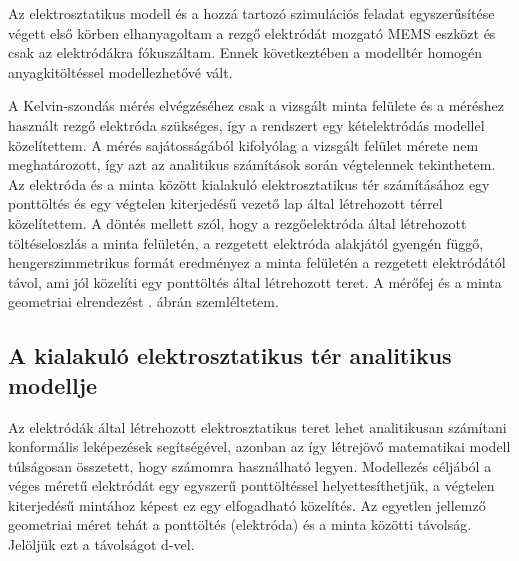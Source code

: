 Az elektrosztatikus modell és a hozzá tartozó szimulációs feladat egyszerűsítése végett első körben elhanyagoltam a rezgő elektródát mozgató MEMS eszközt és csak az elektródákra fókuszáltam. Ennek következtében a modelltér homogén anyagkitöltéssel modellezhetővé vált.

A Kelvin-szondás mérés elvégzéséhez csak a vizsgált minta felülete és a méréshez használt rezgő elektróda szükséges, így a rendszert egy kételektródás modellel közelítettem. A mérés sajátosságából kifolyólag a vizsgált felület mérete nem meghatározott, így azt az analitikus számítások során végtelennek tekinthetem. Az elektróda és a minta között kialakuló elektrosztatikus tér számításához egy ponttöltés és egy végtelen kiterjedésű vezető lap által létrehozott térrel közelítettem. A döntés mellett szól, hogy a rezgőelektróda által létrehozott töltéseloszlás a minta felületén, a rezgetett elektróda alakjától gyengén függő, hengerszimmetrikus formát eredményez a minta felületén a rezgetett elektródától távol, ami jól közelíti egy ponttöltés által létrehozott teret. A mérőfej és a minta geometriai elrendezést . ábrán szemléltetem.


\subsection{A kialakuló elektrosztatikus tér analitikus modellje}
\label{sec:point_charge}

Az elektródák által létrehozott elektrosztatikus teret lehet analitikusan számítani konformális leképezések segítségével\cite{conformal}, azonban az így létrejövő matematikai modell túlságosan összetett, hogy számomra használható legyen. Modellezés céljából a véges méretű elektródát egy egyszerű ponttöltéssel helyettesíthetjük, a végtelen kiterjedésű mintához képest ez egy elfogadható közelítés. Az egyetlen jellemző geometriai méret tehát a ponttöltés (elektróda) és a minta közötti távolság. Jelöljük ezt a távolságot d-vel.

